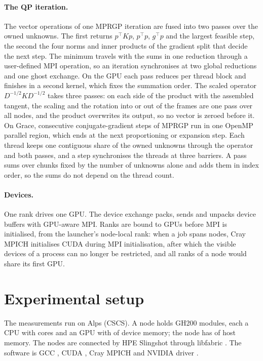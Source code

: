 \documentclass[sigconf,nonacm]{acmart}
\begin{document}
\paragraph{The QP iteration.} The vector operations of one MPRGP iteration are fused into two
passes over the owned unknowns. The first returns $p^\top Kp$, $p^\top p$, $g^\top p$ and the
largest feasible step, the second the four norms and inner products of the gradient split that
decide the next step. The minimum travels with the sums in one reduction through a user-defined
MPI operation, so an iteration synchronises at two global reductions and one ghost exchange. On
the GPU each pass reduces per thread block and finishes in a second kernel, which fixes the
summation order. The scaled operator $D^{-1/2}KD^{-1/2}$ takes three passes: on each side of the
product with the assembled tangent, the scaling and the rotation into or out of the frames are one
pass over all nodes, and the product overwrites its output, so no vector is zeroed before it.
On Grace, consecutive conjugate-gradient steps of MPRGP run in one OpenMP parallel region, which
ends at the next proportioning or expansion step. Each thread keeps one contiguous share of the
owned unknowns through the operator and both passes, and a step synchronises the threads at three
barriers. A pass sums over chunks fixed by the number of unknowns alone and adds them in index
order, so the sums do not depend on the thread count.

\paragraph{Devices.} One rank drives one GPU. The device exchange packs, sends and unpacks device
buffers with GPU-aware MPI. Ranks are bound to GPUs before MPI is initialised, from the launcher's
node-local rank: when a job spans nodes, Cray MPICH initialises CUDA during MPI initialisation,
after which the visible devices of a process can no longer be restricted, and all ranks of a node
would share its first GPU.

\section{Experimental setup}

The measurements run on Alps (CSCS). A node holds \machineModules{} GH200 modules, each a
\machineCPU{} CPU with \machineCores{} cores and an \machineGPU{} GPU with \machineGPUMemory{} of
device memory; the node has \machineHostMemory{} of host memory. The nodes are connected by HPE
Slingshot through libfabric \machineLibfabric{}. The software is GCC \machineGCC{}, CUDA
\machineCUDA{}, Cray MPICH \machineMPICH{} and NVIDIA driver \machineDriver{}.
\end{document}
